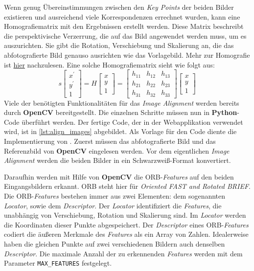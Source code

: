 Wenn genug Übereinstimmungen zwischen den \textit{Key Points} der beiden Bilder existieren und ausreichend viele Korrespondenzen errechnet wurden, kann eine 
Homografiematrix mit den Ergebnissen erstellt werden. Diese Matrix beschreibt die perspektivische Verzerrung, die auf das Bild angewendet werden muss, um es
auszurichten. Sie gibt die Rotation, Verschiebung und Skalierung an, die das abfotografierte Bild genauso ausrichten wie das Vorlagebild. Mehr zur Homografie
ist \hyperref{https://docs.opencv.org/4.x/d9/dab/tutorial_homography.html}{}{}{hier} nachzulesen.\cite{rosebrock} Eine solche Homografiematrix sieht wie folgt aus:
\[s \begin{bmatrix} x^{'} \\ y^{'} \\ 1 \end{bmatrix} 
= H \begin{bmatrix} x \\ y \\ 1 \end{bmatrix} 
= \begin{bmatrix} h_{11} & h_{12} & h_{13} \\ h_{21} & h_{22} & h_{23} \\ h_{31} & h_{32} & h_{33} \end{bmatrix} 
\begin{bmatrix} x \\ y \\ 1 \end{bmatrix}\]
Viele der benötigten Funktionalitäten für das \textit{Image Alignment} werden bereits durch \textbf{OpenCV} bereitgestellt.
Die einzelnen Schritte müssen nun in \textbf{Python}-Code überführt werden. Der fertige Code, der in der Webapplikation verwendet wird, ist in \ref{lst:align_images}
abgebildet. Als Vorlage für den Code diente die Implementierung von \citeauthor{rosebrock}. Zuerst müssen das abfotografierte Bild und das Referenzbild
von \textbf{OpenCV} eingelesen werden. Vor dem eigentlichen \textit{Image Alignment} werden die beiden Bilder in ein Schwarzweiß-Format konvertiert.

Daraufhin werden mit Hilfe von \textbf{OpenCV} die ORB-\textit{Features} auf den beiden Eingangsbildern erkannt.
ORB steht hier für \textit{Oriented FAST and Rotated BRIEF}. Die ORB-\textit{Features} bestehen immer aus zwei Elementen: dem sogenannten 
\textit{Locator}, sowie dem \textit{Descriptor}. Der \textit{Locator} identifiziert die \textit{Features}, die unabhängig von Verschiebung, Rotation und Skalierung
sind. Im \textit{Locator} werden die Koordinaten dieser Punkte abgespeichert. Der \textit{Descriptor} eines ORB-\textit{Features} codiert die äußeren Merkmale
des \textit{Features} als ein Array von Zahlen. Idealerweise haben die gleichen Punkte auf zwei verschiedenen Bildern auch denselben \textit{Descriptor}.
Die maximale Anzahl der zu erkennenden \textit{Features} werden mit dem Parameter \texttt{MAX\_FEATURES} festgelegt.

